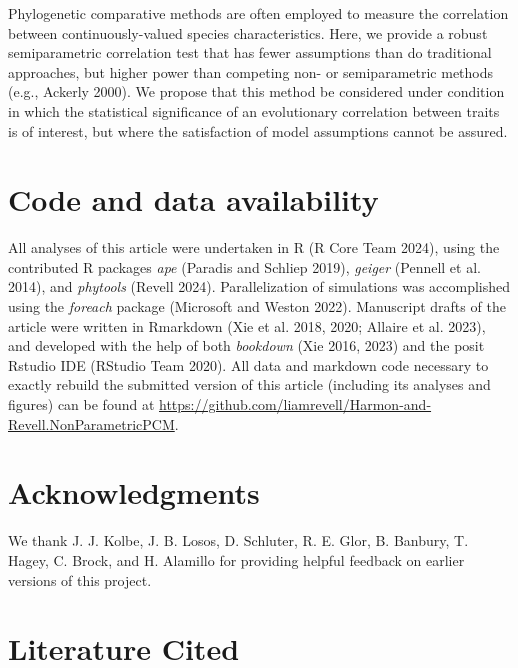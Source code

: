 \documentclass[fleqn,10pt,lineno]{wlpeerj} %
\begin{document}
Phylogenetic comparative methods are often employed to measure the correlation between continuously-valued species characteristics. Here, we provide a robust semiparametric correlation test that has fewer assumptions than do traditional approaches, but higher power than competing non- or semiparametric methods (e.g., Ackerly 2000). We propose that this method be considered under condition in which the statistical significance of an evolutionary correlation between traits is of interest, but where the satisfaction of model assumptions cannot be assured.

\section{Code and data availability}\label{code-and-data-availability}

All analyses of this article were undertaken in R (R Core Team 2024), using the contributed R packages \emph{ape} (Paradis and Schliep 2019), \emph{geiger} (Pennell et al. 2014), and \emph{phytools} (Revell 2024). Parallelization of simulations was accomplished using the \emph{foreach} package (Microsoft and Weston 2022). Manuscript drafts of the article were written in Rmarkdown (Xie et al. 2018, 2020; Allaire et al. 2023), and developed with the help of both \emph{bookdown} (Xie 2016, 2023) and the posit Rstudio IDE (RStudio Team 2020). All data and markdown code necessary to exactly rebuild the submitted version of this article (including its analyses and figures) can be found at \href{https://github.com/liamrevell/Revell-and-Harmon.NonParametricPCM}{https://github.com/liamrevell/Harmon-and-Revell.NonParametricPCM}.

\section{Acknowledgments}\label{acknowledgments}

We thank J. J. Kolbe, J. B. Losos, D. Schluter, R. E. Glor, B. Banbury, T. Hagey, C. Brock, and H. Alamillo for providing helpful feedback on earlier versions of this project.

\section*{Literature Cited}\label{literature-cited}
\end{document}
